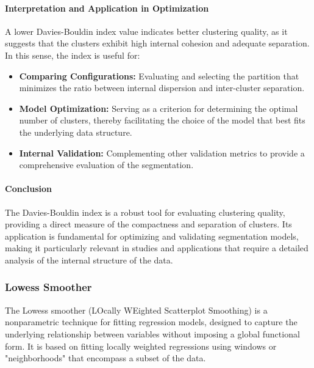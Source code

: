 \documentclass[10pt]{article}
\begin{document}
\paragraph{Interpretation and Application in Optimization}
A lower Davies-Bouldin index value indicates better clustering quality, as it suggests that the clusters exhibit high internal cohesion and adequate separation. In this sense, the index is useful for:
\begin{itemize}
    \item \textbf{Comparing Configurations:} Evaluating and selecting the partition that minimizes the ratio between internal dispersion and inter-cluster separation.
    \item \textbf{Model Optimization:} Serving as a criterion for determining the optimal number of clusters, thereby facilitating the choice of the model that best fits the underlying data structure.
    \item \textbf{Internal Validation:} Complementing other validation metrics to provide a comprehensive evaluation of the segmentation.
\end{itemize}

\paragraph{Conclusion}  
The Davies-Bouldin index is a robust tool for evaluating clustering quality, providing a direct measure of the compactness and separation of clusters. Its application is fundamental for optimizing and validating segmentation models, making it particularly relevant in studies and applications that require a detailed analysis of the internal structure of the data.

\subsubsection{Lowess Smoother}

The Lowess smoother (LOcally WEighted Scatterplot Smoothing) is a nonparametric technique for fitting regression models, designed to capture the underlying relationship between variables without imposing a global functional form. It is based on fitting locally weighted regressions using windows or "neighborhoods" that encompass a subset of the data.
\end{document}
